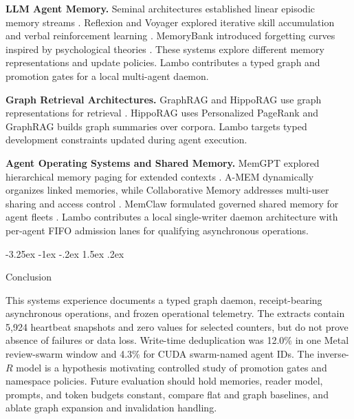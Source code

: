 \documentclass[10pt,twocolumn]{article}
\makeatletter
\renewcommand\section{\@startsection{section}{1}{\z@}%
  {-3.25ex \@plus -1ex \@minus -.2ex}%
  {1.5ex \@plus .2ex}%
  {\normalfont\large\bfseries\raggedright}}
\makeatother
\begin{document}
\textbf{LLM Agent Memory.}
Seminal architectures established linear episodic memory streams \cite{park2023generative}.
Reflexion and Voyager explored iterative skill accumulation and verbal reinforcement learning \cite{shinn2023reflexion, wang2023voyager}.
MemoryBank introduced forgetting curves inspired by psychological theories \cite{zhong2023memorybank}.
These systems explore different memory representations and update policies. Lambo contributes a typed graph and promotion gates for a local multi-agent daemon.

\textbf{Graph Retrieval Architectures.}
GraphRAG and HippoRAG use graph representations for retrieval \cite{edge2024graphrag, gutierrez2024hipporag}.
HippoRAG uses Personalized PageRank and GraphRAG builds graph summaries over corpora. Lambo targets typed development constraints updated during agent execution.

\textbf{Agent Operating Systems and Shared Memory.}
MemGPT explored hierarchical memory paging for extended contexts \cite{packer2023memgpt}.
A-MEM dynamically organizes linked memories, while Collaborative Memory addresses multi-user sharing and access control \cite{xu2025amem, zhang2025collaborative}.
MemClaw formulated governed shared memory for agent fleets \cite{memclaw2026governed}.
Lambo contributes a local single-writer daemon architecture with per-agent FIFO admission lanes for qualifying asynchronous operations.

\section{Conclusion}

This systems experience documents a typed graph daemon, receipt-bearing asynchronous operations, and frozen operational telemetry.
The extracts contain 5,924 heartbeat snapshots and zero values for selected counters, but do not prove absence of failures or data loss.
Write-time deduplication was 12.0\% in one Metal review-swarm window and 4.3\% for CUDA swarm-named agent IDs.
The inverse-$R$ model is a hypothesis motivating controlled study of promotion gates and namespace policies.
Future evaluation should hold memories, reader model, prompts, and token budgets constant, compare flat and graph baselines, and ablate graph expansion and invalidation handling.



\end{document}

